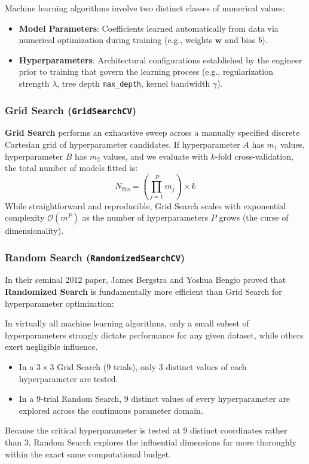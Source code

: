 Machine learning algorithms involve two distinct classes of numerical values:
\begin{itemize}
    \item \textbf{Model Parameters}: Coefficients learned automatically from data via numerical optimization during training (e.g., weights $\mathbf{w}$ and bias $b$).
    \item \textbf{Hyperparameters}: Architectural configurations established by the engineer prior to training that govern the learning process (e.g., regularization strength $\lambda$, tree depth \texttt{max\_depth}, kernel bandwidth $\gamma$).
\end{itemize}

\subsubsection{Grid Search (\texttt{GridSearchCV})}

\textbf{Grid Search} performs an exhaustive sweep across a manually specified discrete Cartesian grid of hyperparameter candidates. If hyperparameter $A$ has $m_1$ values, hyperparameter $B$ has $m_2$ values, and we evaluate with $k$-fold cross-validation, the total number of models fitted is:
\begin{equation}
N_{\text{fits}} = \left( \prod_{j=1}^P m_j \right) \times k\label{eq:grid_search_cost}
\end{equation}
While straightforward and reproducible, Grid Search scales with exponential complexity $\mathcal{O}(m^P)$ as the number of hyperparameters $P$ grows (the curse of dimensionality).

\subsubsection{Random Search (\texttt{RandomizedSearchCV})}

In their seminal 2012 paper, James Bergstra and Yoshua Bengio proved that \textbf{Randomized Search} is fundamentally more efficient than Grid Search for hyperparameter optimization:

\begin{keyidea}
In virtually all machine learning algorithms, only a small subset of hyperparameters strongly dictate performance for any given dataset, while others exert negligible influence.
\begin{itemize}
    \item In a $3 \times 3$ Grid Search ($9$ trials), only $3$ distinct values of each hyperparameter are tested.
    \item In a $9$-trial Random Search, $9$ distinct values of every hyperparameter are explored across the continuous parameter domain.
\end{itemize}
Because the critical hyperparameter is tested at $9$ distinct coordinates rather than $3$, Random Search explores the influential dimensions far more thoroughly within the exact same computational budget.
\end{keyidea}

